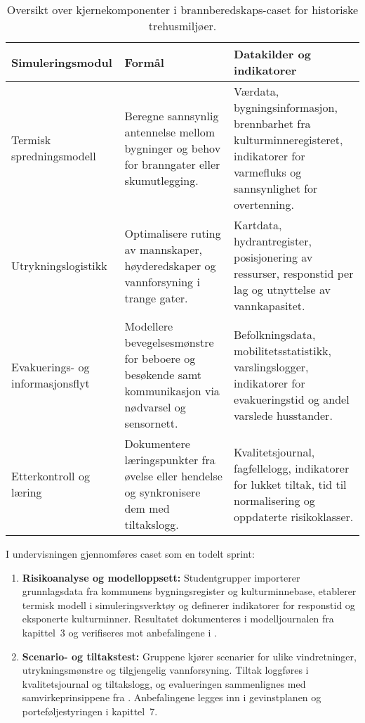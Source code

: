 \begin{table}[htbp]
    \centering
    \begin{tabular}{p{}p{}p{}}
        \toprule
        \textbf{Simuleringsmodul} & \textbf{Formål} & \textbf{Datakilder og indikatorer}\\
        \midrule
        Termisk spredningsmodell & Beregne sannsynlig antennelse mellom bygninger og behov for branngater eller skumutlegging. & Værdata, bygningsinformasjon, brennbarhet fra kulturminneregisteret, indikatorer for varmefluks og sannsynlighet for overtenning.\\
        Utrykningslogistikk & Optimalisere ruting av mannskaper, høyderedskaper og vannforsyning i trange gater. & Kartdata, hydrantregister, posisjonering av ressurser, responstid per lag og utnyttelse av vannkapasitet.\\
        Evakuerings- og informasjonsflyt & Modellere bevegelsesmønstre for beboere og besøkende samt kommunikasjon via nødvarsel og sensornett. & Befolkningsdata, mobilitetsstatistikk, varslingslogger, indikatorer for evakueringstid og andel varslede husstander.\\
        Etterkontroll og læring & Dokumentere læringspunkter fra øvelse eller hendelse og synkronisere dem med tiltakslogg. & Kvalitetsjournal, fagfellelogg, indikatorer for lukket tiltak, tid til normalisering og oppdaterte risikoklasser.\\
        \bottomrule
    \end{tabular}
    \caption{Oversikt over kjernekomponenter i brannberedskaps-caset for historiske trehusmiljøer.}
    \label{tab:kap04-brann-simulering}
\end{table}

I undervisningen gjennomføres caset som en todelt sprint:
\begin{enumerate}
    \item \textbf{Risikoanalyse og modelloppsett:} Studentgrupper importerer grunnlagsdata fra kommunens bygningsregister og kulturminnebase, etablerer termisk modell i simuleringsverktøy og definerer indikatorer for responstid og eksponerte kulturminner. Resultatet dokumenteres i modelljournalen fra kapittel~3 og verifiseres mot anbefalingene i \citet{dsb2021trehus}.
    \item \textbf{Scenario- og tiltakstest:} Gruppene kjører scenarier for ulike vindretninger, utrykningsmønstre og tilgjengelig vannforsyning. Tiltak loggføres i kvalitetsjournal og tiltakslogg, og evalueringen sammenlignes med samvirkeprinsippene fra \citet{dsb2023samvirke}. Anbefalingene legges inn i gevinstplanen og porteføljestyringen i kapittel~7.
\end{enumerate}

